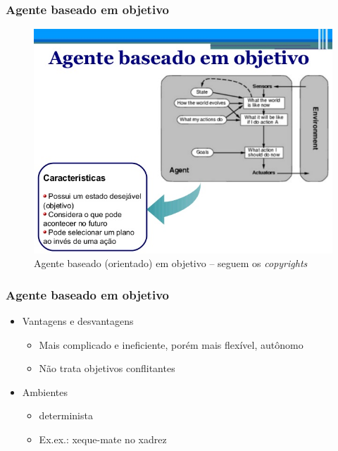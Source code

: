 \begin{frame} %

 \frametitle{Agente baseado em objetivo}

\begin{figure}[!ht]
  \centering
  \includegraphics[height =.7\textheight,width=.7\textwidth]
  {figuras/agente_baseado_em_objetivo.jpg}
  \caption{Agente baseado (orientado) em objetivo -- seguem os \textit{copyrights}}
\end{figure}

\end{frame}




\begin{frame} %

    \frametitle{Agente baseado em objetivo}

\begin{itemize}
  \item Vantagens e desvantagens

  \begin{itemize}
    \item Mais complicado e ineficiente,  porém mais flexível, autônomo
    \item Não trata objetivos conflitantes
  \end{itemize}
  
  \item Ambientes

\begin{itemize}
  \item determinista 
  \item Ex.ex.: xeque-mate no xadrez
\end{itemize}
  
\end{itemize}
\end{frame}

